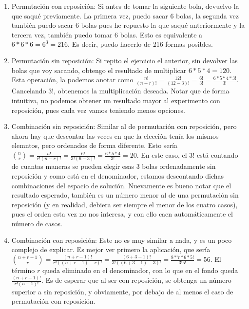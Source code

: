 \documentclass[]{article}
\begin{document}
\begin{enumerate}
\def\labelenumi{\arabic{enumi}.}
\item
  Permutación con reposición: Si antes de tomar la siguiente bola,
  devuelvo la que saqué previamente. La primera vez, puedo sacar 6
  bolas, la segunda vez también puedo sacar 6 bolas pues he repuesto la
  que saqué anteriormente y la tercera vez, también puedo tomar 6 bolas.
  Esto es equivalente a \(6 * 6 * 6 = 6^3 = 216\). Es decir, puedo
  hacerlo de 216 formas posibles.
\item
  Permutación sin reposición: Si repito el ejercicio el anterior, sin
  devolver las bolas que voy sacando, obtengo el resultado de
  multiplicar \(6 * 5 * 4 = 120\). Esta operación, la podemos anotar
  como
  \(\frac{n!}{(n-r)!} = \frac{12!}{(12-3)!} = \frac{6!}{3!} = \frac{6*5*4*3!}{3!}\).
  Cancelando \(3!\), obtenemos la multiplicación deseada. Notar que de
  forma intuitiva, no podemos obtener un resultado mayor al experimento
  con reposición, pues cada vez vamos teniendo menos opciones.
\item
  Combinación sin reposición: Similar al de permutación con reposición,
  pero ahora hay que descontar las veces en que la elección tenía los
  mismos elemntos, pero ordenados de forma diferente. Esto sería
  \(\binom{n}{r} = \frac{n!}{r!(n-r)!} = \frac{6!}{3!(6-3)!} = \frac{6*5*4}{3!} = 20\).
  En este caso, el \(3!\) está contando de cuantas maneras se pueden
  elegir esas 3 bolas ordenadamente sin reposición y como está en el
  denominador, estamos descontando dichas combinaciones del espacio de
  solución. Nuevamente es bueno notar que el resultado esperado, también
  es un número menor al de una permutación sin reposición (y en
  realidad, debiera ser siempre el menor de los cuatro casos), pues el
  orden esta vez no nos interesa, y con ello caen automáticamente el
  número de casos.
\item
  Combinación con reposición: Este no es muy similar a nada, y es un
  poco complejo de explicar. Es mejor ver primero la aplicación, que
  sería
  \(\binom{n + r - 1}{r} = \frac{(n + r - 1)!}{r!((n + r - 1) - r)!} = \frac{(6 + 3 - 1)!}{3!((6 + 3 - 1) - 3)!} = \frac{8*7*6*5!}{3! 5!} = 56\).
  El término \(r\) queda eliminado en el denominador, con lo que en el
  fondo queda \(\frac{(n + r - 1)!}{r!(n - 1)!}\). Es de esperar que al
  ser con reposición, se obtenga un número superior a sin reposición, y
  obviamente, por debajo de al menos el caso de permutación con
  reposición.
\end{enumerate}
\end{document}
